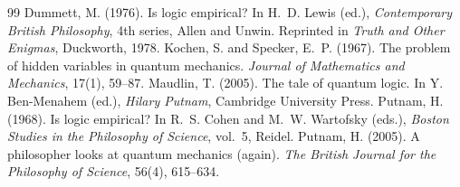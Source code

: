 \documentclass{situationist-preprint}
\begin{document}
\begin{thebibliography}{99}\small
{} Dummett, M. (1976). Is logic empirical? In H.~D. Lewis (ed.), \emph{Contemporary British Philosophy}, 4th series, Allen and Unwin. Reprinted in \emph{Truth and Other Enigmas}, Duckworth, 1978.
 Kochen, S. and Specker, E.~P. (1967). The problem of hidden variables in quantum mechanics. \emph{Journal of Mathematics and Mechanics}, 17(1), 59--87.
 Maudlin, T. (2005). The tale of quantum logic. In Y. Ben-Menahem (ed.), \emph{Hilary Putnam}, Cambridge University Press.
 Putnam, H. (1968). Is logic empirical? In R.~S. Cohen and M.~W. Wartofsky (eds.), \emph{Boston Studies in the Philosophy of Science}, vol.~5, Reidel.
 Putnam, H. (2005). A philosopher looks at quantum mechanics (again). \emph{The British Journal for the Philosophy of Science}, 56(4), 615--634.
\end{thebibliography}
\end{document}
